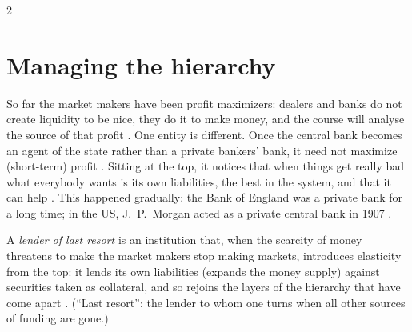 \begin{paracol}{2}
\section{Managing the hierarchy}\label{sec:nh-managing}

So far the market makers have been profit maximizers: dealers and banks do not create liquidity to be nice, they do it to
make money, and the course will analyse the source of that profit . One entity is different.
Once the central bank becomes an agent of the state rather than a private bankers' bank, it need not maximize (short-term)
profit . Sitting at the top, it notices that when things get really bad what everybody wants is its own
liabilities, the best in the system, and that it can help . This happened gradually: the Bank of England was
a private bank for a long time; in the US, J.~P.~Morgan acted as a private central bank in 1907 .

\begin{definition}\label{def:nh-lolr}
A \emph{lender of last resort} is an institution that, when the scarcity of money threatens to make the market makers stop
making markets, introduces elasticity from the top: it lends its own liabilities (expands the money supply) against
securities taken as collateral, and so rejoins the layers of the hierarchy that have come apart .
(``Last resort'': the lender to whom one turns when all other sources of funding are gone.)
\end{definition}


\end{paracol}

